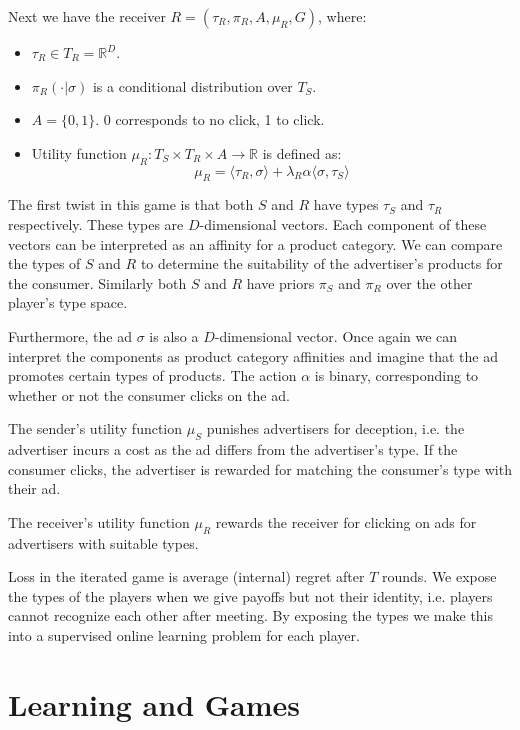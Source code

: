 \documentclass{article}
\begin{document}
\noindent Next we have the receiver $R = (\tau_R, \pi_R, A, \mu_R, G)$, where:
\begin{itemize}
    \item $\tau_R \in T_R = \mathbb{R}^D$.
    \item $\pi_R(\cdot|\sigma)$ is a conditional distribution over $T_S$.
    \item $A = \lbrace 0,1 \rbrace$. 0 corresponds to no click, 1 to click.
    \item Utility function $\mu_R: T_S \times T_R \times A \rightarrow \mathbb{R}$ is defined as:
    \begin{equation}
        \mu_R = \langle \tau_R, \sigma \rangle + \lambda_R \alpha \langle \sigma, \tau_S \rangle
    \end{equation}
\end{itemize}

\noindent The first twist in this game is that both $S$ and $R$ have types $\tau_S$ and $\tau_R$ respectively. These types are $D$-dimensional vectors. Each component of these vectors can be interpreted as an affinity for a product category. We can compare the types of $S$ and $R$ to determine the suitability of the advertiser's products for the consumer. Similarly both $S$ and $R$ have priors $\pi_S$ and $\pi_R$ over the other player's type space.

Furthermore, the ad $\sigma$ is also a $D$-dimensional vector. Once again we can interpret the components as product category affinities and imagine that the ad promotes certain types of products. The action $\alpha$ is binary, corresponding to whether or not the consumer clicks on the ad.

The sender's utility function $\mu_S$ punishes advertisers for deception, i.e. the advertiser incurs a cost as the ad differs from the advertiser's type. If the consumer clicks, the advertiser is rewarded for matching the consumer's type with their ad. 

The receiver's utility function $\mu_R$ rewards the receiver for clicking on ads for advertisers with suitable types. 

Loss in the iterated game is average (internal) regret after $T$ rounds. We expose the types of the players when we give payoffs but not their identity, i.e. players cannot recognize each other after meeting. By exposing the types we make this into a supervised online learning problem for each player.

\section{Learning and Games}
\end{document}
